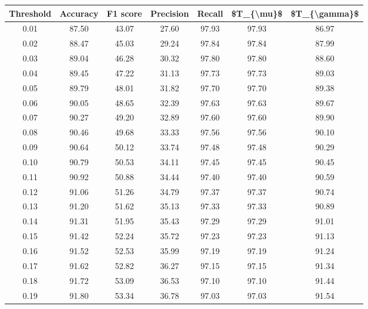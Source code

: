 \begin{tabular}{|c|c|c|c|c|c|c|}
\hline
 Threshold &  Accuracy &  F1 score &  Precision &  Recall &  \$T\_\{\textbackslash mu\}\$ &  \$T\_\{\textbackslash gamma\}\$ \\
\hline
      0.01 &     87.50 &     43.07 &      27.60 &   97.93 &      97.93 &         86.97 \\
      0.02 &     88.47 &     45.03 &      29.24 &   97.84 &      97.84 &         87.99 \\
      0.03 &     89.04 &     46.28 &      30.32 &   97.80 &      97.80 &         88.60 \\
      0.04 &     89.45 &     47.22 &      31.13 &   97.73 &      97.73 &         89.03 \\
      0.05 &     89.79 &     48.01 &      31.82 &   97.70 &      97.70 &         89.38 \\
      0.06 &     90.05 &     48.65 &      32.39 &   97.63 &      97.63 &         89.67 \\
      0.07 &     90.27 &     49.20 &      32.89 &   97.60 &      97.60 &         89.90 \\
      0.08 &     90.46 &     49.68 &      33.33 &   97.56 &      97.56 &         90.10 \\
      0.09 &     90.64 &     50.12 &      33.74 &   97.48 &      97.48 &         90.29 \\
      0.10 &     90.79 &     50.53 &      34.11 &   97.45 &      97.45 &         90.45 \\
      0.11 &     90.92 &     50.88 &      34.44 &   97.40 &      97.40 &         90.59 \\
      0.12 &     91.06 &     51.26 &      34.79 &   97.37 &      97.37 &         90.74 \\
      0.13 &     91.20 &     51.62 &      35.13 &   97.33 &      97.33 &         90.89 \\
      0.14 &     91.31 &     51.95 &      35.43 &   97.29 &      97.29 &         91.01 \\
      0.15 &     91.42 &     52.24 &      35.72 &   97.23 &      97.23 &         91.13 \\
      0.16 &     91.52 &     52.53 &      35.99 &   97.19 &      97.19 &         91.24 \\
      0.17 &     91.62 &     52.82 &      36.27 &   97.15 &      97.15 &         91.34 \\
      0.18 &     91.72 &     53.09 &      36.53 &   97.10 &      97.10 &         91.44 \\
      0.19 &     91.80 &     53.34 &      36.78 &   97.03 &      97.03 &         91.54 \\

\end{tabular}

